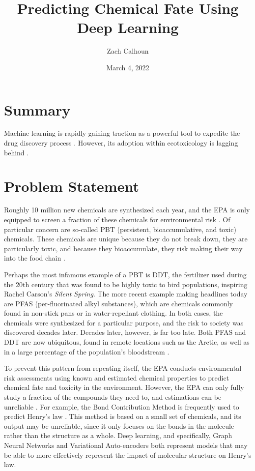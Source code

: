 \documentclass[12pt, oneside]{article}   	%
\title{Predicting Chemical Fate Using Deep Learning}
\author{Zach Calhoun}
\date{March 4, 2022}
\begin{document}
\maketitle

\section{Summary}
Machine learning is rapidly gaining traction as a powerful tool to expedite the drug discovery process \cite{Jiang:2021}. However, its adoption within ecotoxicology is lagging behind \cite{miller:2018}.

\section{Problem Statement}
Roughly 10 million new chemicals are synthesized each year, and the EPA is only equipped to screen a fraction of these chemicals for environmental risk \cite{burton}. Of particular concern are so-called PBT (persistent, bioaccumulative, and toxic) chemicals. These chemicals are unique because they do not break down, they are particularly toxic, and because they bioaccumulate, they risk making their way into the food chain \cite{matthies}.

Perhaps the most infamous example of a PBT is DDT, the fertilizer used during the 20th century that was found to be highly toxic to bird populations, inspiring Rachel Carson's \emph{Silent Spring}. The more recent example making headlines today are PFAS (per-fluorinated alkyl substances), which are chemicals commonly found in non-stick pans or in water-repellant clothing. In both cases, the chemicals were synthesized for a particular purpose, and the risk to society was discovered decades later. Decades later, however, is far too late. Both PFAS and DDT are now ubiquitous, found in remote locations such as the Arctic, as well as in a large percentage of the population's bloodstream \cite{czub}.

To prevent this pattern from repeating itself, the EPA conducts environmental risk assessments using known and estimated chemical properties to predict chemical fate and toxicity in the environment. However, the EPA can only fully study a fraction of the compounds they need to, and estimations can be unreliable \cite{burton}. For example, the Bond Contribution Method is frequently used to predict Henry's law \cite{meylan}. This method is based on a small set of chemicals, and its output may be unreliable, since it only focuses on the bonds in the molecule rather than the structure as a whole. Deep learning, and specifically, Graph Neural Networks and Variational Auto-encoders both represent models that may be able to more effectively represent the impact of molecular structure on Henry's law.
\end{document}
